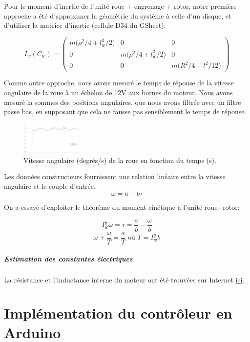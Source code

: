\documentclass{report}
\begin{document}
Pour le moment d'inertie de l'unité roue + engrenage + rotor, 
notre première approche a été d'approximer la géométrie du système à celle d'un disque,
et d'utiliser la matrice d'inertie (cellule D34 du GSheet):

\begin{equation*}
    I_w(C_w) = 
    \begin{pmatrix}
        m \big(\rho^2/4 + l_w^2/2 \big) & 0 & 0 \\
        0 & m \big(\rho^2/4 + l_w^2/2 \big) & 0 \\
        0 & 0 & m \big(R^2/4 + l^2/12 \big)
    \end{pmatrix}
\end{equation*}

Comme autre approche, nous avons mesuré le temps de réponse de la 
vitesse angulaire de la roue à un échelon de 12V aux bornes du moteur.
Nous avons mesuré la sommes des positions angulaires, que nous avons filtrée 
avec un filtre passe bas, en supposant que cela ne fausse pas sensiblement le 
temps de réponse.

\begin{figure}[h]  %
    \centering
    \includegraphics[width=3cm]{figures/inertie_roue.png}
    \caption{Vitesse angulaire (degrés/s) de la roue en fonction du temps (s).}
\end{figure}

Les données constructeurs fournissent une relation 
linéaire entre la vitesse angulaire et le couple d'entrée. $$\omega = a - b\tau$$

On a essayé d'exploiter le théorème du moment cinétique à l'unité roue+rotor:

$$I_w^y\dot{\omega} = \tau = \frac{a}{b} - \frac{\omega}{b}$$
$$\dot{\omega} +  \frac{\omega}{T} = \frac{a}{T} \text{  où  } T=I_w^yb$$


\paragraph{Estimation des constantes électriques}
La résistance et l'inductance interne du moteur ont été trouvées sur Internet 
\href{https://forum.pololu.com/t/mechanics-and-electrical-parameters/18153/2}{ici}.

\chapter{Implémentation du contrôleur en Arduino}

\end{document}

